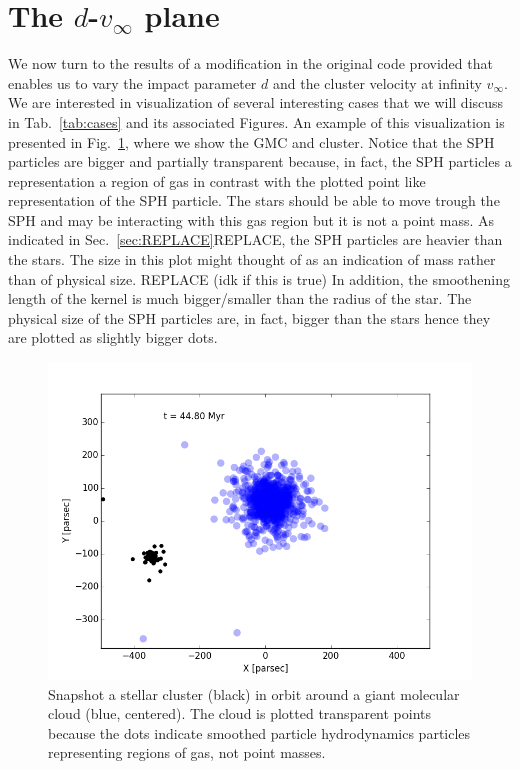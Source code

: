 \documentclass{aa}
\begin{document}
\section{The $d$-$v_\infty$ plane} \label{sec:dvplane}
We now turn to the results of a modification in the original code provided that enables us to vary the impact parameter $d$ and the cluster velocity at infinity $v_\infty$. We are interested in visualization of several interesting cases that we will discuss in Tab.~\ref{tab:cases} and its associated Figures.
An example of this visualization is presented in Fig.~\ref{fig:GMC_with_cluster}, where we show the GMC and cluster. Notice that the SPH particles are bigger and partially transparent because, in fact, the SPH particles a representation a region of gas in contrast with the plotted point like representation of the SPH particle. The stars should be able to move trough the SPH and may be interacting with this gas region but it is not a point mass. As indicated in Sec.~\ref{sec:REPLACE}REPLACE, the SPH particles are heavier than the stars. The size in this plot might thought of as an indication of mass rather than of physical size. REPLACE (idk if this is true) In addition, the smoothening length of the kernel is much bigger/smaller than the radius of the star. The physical size of the SPH particles are, in fact, bigger than the stars hence they are plotted as slightly bigger dots.

\begin{figure}
    \centering
    \includegraphics[width=\hsize]{img/test-44-8.png}
    \caption{Snapshot a stellar cluster (black) in orbit around a giant molecular cloud (blue, centered). The cloud is plotted transparent points because the dots indicate smoothed particle hydrodynamics particles representing regions of gas, not point masses.}\label{fig:GMC_with_cluster}
\end{figure}
\end{document}
